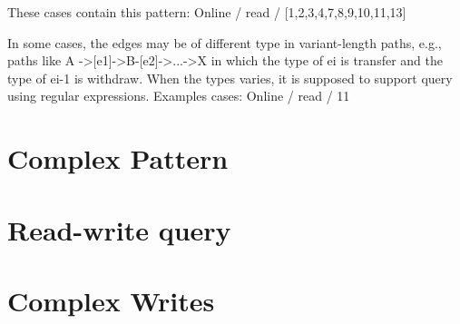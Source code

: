 These cases contain this pattern: Online / read / [1,2,3,4,7,8,9,10,11,13]



In some cases, the edges may be of different type in variant-length paths, e.g.,
paths like A ->[e1]->B-[e2]->...->X in  which the type of ei  is transfer and
the type of ei-1  is withdraw. When the types varies, it is supposed to support
query using regular expressions. Examples cases: Online / read / 11


\section{Complex Pattern}






\section{Read-write query}




\section{Complex Writes}

